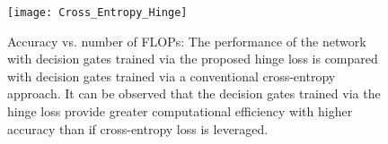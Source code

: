\documentclass{article}
\begin{document}
\begin{figure}
\vspace{-0.3in}
  \begin{minipage}[c]{0.5\textwidth}
  \centering
    \texttt{[image: Cross\_Entropy\_Hinge]}
  \end{minipage}\hfill
  \begin{minipage}[c]{0.5\textwidth}
    \caption{
       \footnotesize Accuracy vs. number of FLOPs: The performance of the network with decision gates trained via the proposed hinge loss is compared with decision gates trained via a conventional cross-entropy approach. It can be observed that the decision gates trained via the hinge loss provide greater computational efficiency with higher accuracy than if cross-entropy loss is leveraged.
    } \label{fig:cross-ent-hinge}
  \end{minipage}
      \vspace{-0.2in}
\end{figure}
\end{document}

